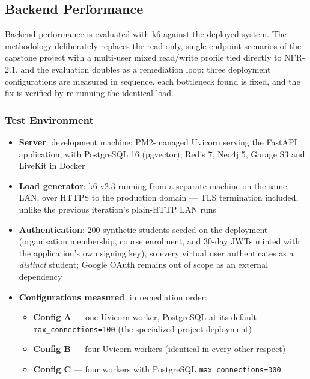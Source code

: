 \subsection{Backend Performance}
\label{sec:eval_backend}

Backend performance is evaluated with k6 against the deployed system. The methodology deliberately replaces the read-only, single-endpoint scenarios of the capstone project with a multi-user mixed read/write profile tied directly to NFR-2.1, and the evaluation doubles as a remediation loop: three deployment configurations are measured in sequence, each bottleneck found is fixed, and the fix is verified by re-running the identical load.

\subsubsection{Test Environment}

\begin{itemize}
    \item \textbf{Server}: development machine; PM2-managed Uvicorn serving the FastAPI application, with PostgreSQL 16 (pgvector), Redis 7, Neo4j 5, Garage S3 and LiveKit in Docker
    \item \textbf{Load generator}: k6 v2.3 running from a separate machine on the same LAN, over HTTPS to the production domain --- TLS termination included, unlike the previous iteration's plain-HTTP LAN runs
    \item \textbf{Authentication}: 200 synthetic students seeded on the deployment (organisation membership, course enrolment, and 30-day JWTs minted with the application's own signing key), so every virtual user authenticates as a \emph{distinct} student; Google OAuth remains out of scope as an external dependency
    \item \textbf{Configurations measured}, in remediation order:
    \begin{itemize}
        \item \textbf{Config A} --- one Uvicorn worker, PostgreSQL at its default \texttt{max\_connections=100} (the specialized-project deployment)
        \item \textbf{Config B} --- four Uvicorn workers (identical in every other respect)
        \item \textbf{Config C} --- four workers with PostgreSQL \texttt{max\_connections=300}
    \end{itemize}
\end{itemize}

